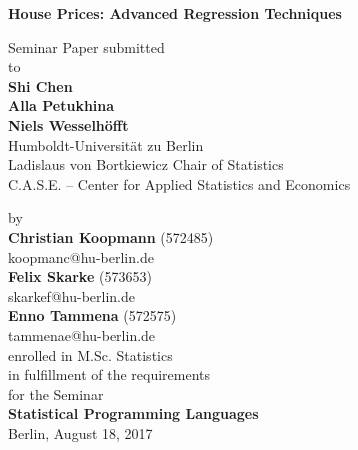 \begin{center}

    {\Large{\bf House Prices: Advanced Regression Techniques}} \vspace{0.5cm}


    {\normalsize Seminar Paper submitted\\\vspace{0.5cm}
    to}\\\vspace{0.5cm}
    {\normalsize{\bf Shi Chen \\Alla Petukhina \\Niels Wesselh\"offt}} \\\vspace{0.5cm}
    {\normalsize Humboldt-Universit\"at zu Berlin \\
    Ladislaus von Bortkiewicz Chair of Statistics \\
    C.A.S.E. – Center for Applied Statistics
and Economics} \vspace{1cm}


    {\normalsize by \\\vspace{0.5cm}
    {\bf Christian Koopmann}
    (572485)}\\
koopmanc@hu-berlin.de\\ 

    {\normalsize
    {\bf Felix Skarke}
    (573653)}\\
skarkef@hu-berlin.de\\
   {\normalsize
   {\bf Enno Tammena}
    (572575)}\\
 tammenae@hu-berlin.de\\
\vspace{1cm}
enrolled in M.Sc. Statistics\\
\vspace{1cm}
    {\normalsize in fulfillment of the requirements  \\
    for the Seminar \\
    {\bf Statistical Programming Languages} \\
    Berlin, August 18, 2017}

\end{center}
